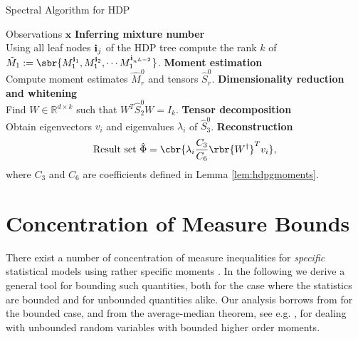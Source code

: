 \documentclass[twoside,11pt]{article}
\newcommand{\ib}{{\bf i}}
\begin{document}
{\begin{algorithm}
\caption{Spectral Algorithm for HDP}
\label{alg:hdpeca}
\begin{algorithmic}[1]
    \REQUIRE Observations $\mathbf{x}$
    \STATE \textbf{Inferring mixture number} \\
    Using all leaf nodes $\ib_j$ of the HDP tree compute the rank $k$ of 
    $\tilde{M}_1:=\sbr{ M_1^{\ib_1}, M_1^{\ib_2},\cdots
      M_1^{\ib_{n^{L-2}}}}$.
    \STATE \textbf{Moment estimation} \\
    Compute moment estimates $\hat{M}_r^{0}$ and tensors $\hat{S}_r^{0}$.
   \STATE \textbf{Dimensionality reduction and whitening} \\
   Find $W\in \mathbb{R}^{d\times k}$ such that $W^T\hat{S}_2^0W = I_k$.
   \STATE \textbf{Tensor decomposition} \\
   Obtain eigenvectors $v_i$ and eigenvalues $\lambda_i$ of $\hat{S}_3^0$.
   \STATE \textbf{Reconstruction}
   \begin{align}
     \label{eq:find0}
     \text{Result set }
     \hat{\Phi} = \cbr{ \lambda_i \frac{C_3}{C_6} \rbr{W^{\dag}}^Tv_i},
   \end{align}
   where $C_3$ and $C_6$ are coefficients defined in Lemma
   \ref{lem:hdpgmoments}. 
\end{algorithmic}
\end{algorithm}


\section{Concentration of Measure Bounds}
\label{sec:concentration}
There exist a number of concentration of measure inequalities for
\emph{specific} statistical models using rather specific moments
\citep{AnaFosHsuKakLiu12}. In the following we derive a general tool
for bounding such quantities, both for the case where the statistics
are bounded and for unbounded quantities alike. Our analysis borrows
from \cite{AltSmo06} for the bounded case, and from the average-median
theorem, see e.g. \cite{AloMatSze99}, for dealing with unbounded random variables with bounded higher order moments.
}
\end{document}
